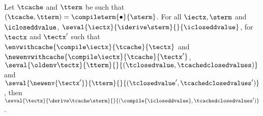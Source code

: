 \begin{theorem}
  \-\\
  \label{thm:soundness-compiled-changesfinal}
  Let $\tcache$ and $\tterm$ be such that 
  $(\tcache, \tterm) = \compileterm{\bullet}{\sterm}$.
  For all $\iectx, \sterm$ and $\icloseddvalue$,
  $\seval{\iectx}{\iderive\sterm}{}{\icloseddvalue}$,
  for $\tectx$ and $\tectx'$ such that
  $\envwithcache{\compile\iectx}{\tcache}{\tectx}$
  and $\newenvwithcache{\compile\iectx}{\tcache}{\tectx'}$,
  $\seval{\oldenv\tectx}{\tterm}{}{(\tclosedvalue, \tcachedclosedvalues)}$ and
  $\seval{\newenv{\tectx'}}{\tterm}{}{(\tclosedvalue', \tcachedclosedvalues')}$,
  then
  $
  \seval{\tectx}{\derive\tcache\sterm}{}{(\compile{\icloseddvalue}, \tcachedclosedvalues')}
  $.
\end{theorem}
